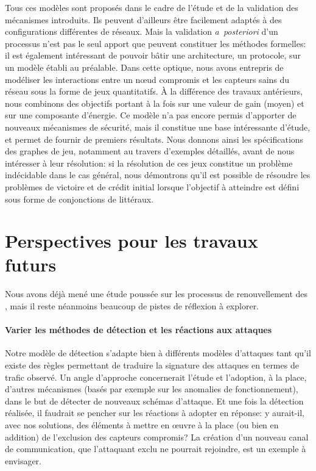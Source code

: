 Tous ces modèles sont proposés dans le cadre de l'étude et de la validation des mécanismes introduits.
Ils peuvent d'ailleurs être facilement adaptés à des configurations différentes de réseaux.
Mais la validation \textit{a~posteriori} d'un processus n'est pas le seul apport que peuvent constituer les méthodes formelles: il est également intéressant de pouvoir bâtir une architecture, un protocole, sur un modèle établi au préalable.
Dans cette optique, nous avons entrepris de modéliser les interactions entre un nœud compromis et les capteurs sains du réseau sous la forme de jeux quantitatifs.
À la différence des travaux antérieurs, nous combinons des objectifs portant à la fois sur une valeur de gain (moyen) et sur une composante d'énergie.
Ce modèle n'a pas encore permis d'apporter de nouveaux mécanismes de sécurité, mais il constitue une base intéressante d'étude, et permet de fournir de premiers résultats.
Nous donnons ainsi les spécifications des graphes de jeu, notamment au travers d'exemples détaillés, avant de nous intéresser à leur résolution: si la résolution de ces jeux constitue un problème indécidable dans le cas général, nous démontrons qu'il est possible de résoudre les problèmes de victoire et de crédit initial lorsque l'objectif à atteindre est défini sous forme de conjonctions de littéraux.

\section{Perspectives pour les travaux futurs}

Nous avons déjà mené une étude poussée sur les processus de renouvellement des \cnst, mais il reste néanmoins beaucoup de pistes de réflexion à explorer.

    \paragraph{Varier les méthodes de détection et les réactions aux attaques}
Notre modèle de détection s'adapte bien à différents modèles d'attaques tant qu'il existe des règles permettant de traduire la signature des attaques en termes de trafic observé.
Un angle d'approche concernerait l'étude et l'adoption, à la place, d'autres mécanismes (basés par exemple sur les anomalies de fonctionnement), dans le but de détecter de nouveaux schémas d'attaque.
Et une fois la détection réalisée, il faudrait se pencher sur les réactions à adopter en réponse: y aurait-il, avec nos solutions, des éléments à mettre en œuvre à la place (ou bien en addition) de l'exclusion des capteurs compromis?
La création d'un nouveau canal de communication, que l'attaquant exclu ne pourrait rejoindre, est un exemple à envisager.

